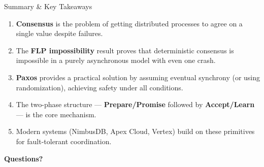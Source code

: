 \documentclass[11pt,aspectratio=169]{beamer}
\begin{document}
\begin{frame}{Summary \& Key Takeaways}
\begin{enumerate}
  \item \textbf{Consensus} is the problem of getting distributed processes to agree on a single value despite failures.

  \vspace{4pt}
  \item The \textbf{FLP impossibility} result proves that deterministic consensus is impossible in a purely asynchronous model with even one crash.

  \vspace{4pt}
  \item \textbf{Paxos} provides a practical solution by assuming eventual synchrony (or using randomization), achieving safety under all conditions.

  \vspace{4pt}
  \item The two-phase structure --- \textbf{Prepare/Promise} followed by \textbf{Accept/Learn} --- is the core mechanism.

  \vspace{4pt}
  \item Modern systems (NimbusDB, Apex Cloud, Vertex) build on these primitives for fault-tolerant coordination.
\end{enumerate}

\vspace{12pt}
\begin{center}
\Large\textcolor{primaryblue}{\textbf{Questions?}}
\end{center}
\end{frame}
\end{document}
